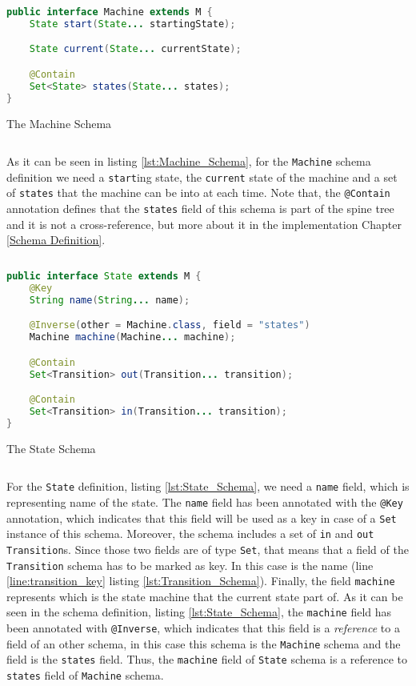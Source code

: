 \begin{sourcecode}[H]
	\begin{lstlisting}[language=Java,escapechar=|]
public interface Machine extends M {
	State start(State... startingState);

	State current(State... currentState);

	@Contain
	Set<State> states(State... states);
}
	\end{lstlisting}
	\caption{The Machine Schema}
	\label{lst:Machine_Schema}
\end{sourcecode}

As it can be seen in listing \ref{lst:Machine_Schema}, for the \texttt{Machine} schema definition we need a \texttt{start}ing state, the \texttt{current} state of the machine and a set of \texttt{states} that the machine can be into at each time.
Note that, the \texttt{@Contain} annotation defines that the \texttt{states} field of this schema is part of the spine tree and it is not a cross-reference, but more about it in the implementation Chapter \ref{Schema Definition}.

\begin{sourcecode}[H]
	\begin{lstlisting}[language=Java,escapechar=|]
public interface State extends M {
	@Key
	String name(String... name);

	@Inverse(other = Machine.class, field = "states")
	Machine machine(Machine... machine);

	@Contain
	Set<Transition> out(Transition... transition);

	@Contain
	Set<Transition> in(Transition... transition);
}
	\end{lstlisting}
	\caption{The State Schema}
	\label{lst:State_Schema}
\end{sourcecode}

For the \texttt{State} definition, listing \ref{lst:State_Schema}, we need a \texttt{name} field, which is representing name of the state. 
The \texttt{name} field has been annotated with the \texttt{@Key} annotation, which indicates that this field will be used as a key in case of a \texttt{Set} instance of this schema.
Moreover, the schema includes a set of \texttt{in} and \texttt{out} \texttt{Transition}s.
Since those two fields are of type \texttt{Set}, that means that a field of the \texttt{Transition} schema has to be marked as key.
In this case is the name (line \ref{line:transition_key} listing \ref{lst:Transition_Schema}).
Finally, the field \texttt{machine} represents which is the state machine that the current state part of. 
As it can be seen in the schema definition, listing \ref{lst:State_Schema}, the \texttt{machine} field has been annotated with \texttt{@Inverse}, which indicates that this field is a \textit{reference} to a field of an other schema, in this case this schema is the \texttt{Machine} schema and the field is the \texttt{states} field.
Thus, the \texttt{machine} field of \texttt{State} schema is a reference to \texttt{states} field of \texttt{Machine} schema.

